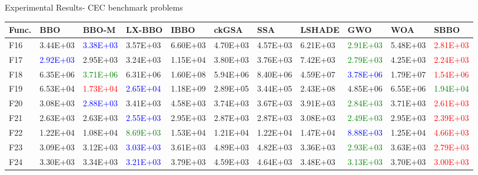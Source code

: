 \documentclass [9pt,times] {beamer}
\begin{document}
 \begin{frame}{Experimental Results- CEC benchmark problems }
     
  \begin{center}
       \fontsize{4.3pt}{7.3pt}\selectfont
\begin{tabular}{p{0.08in}  p{0.25in} |  p{0.23in} |  p{0.25in}|  p{0.25in} |  p{0.25in} | p{0.25in} |  p{0.25in} | p{0.25in} |  p{0.25in} |  p{0.25in}}
    \hline
\textbf{Func.} 		&	 \textbf{BBO} 	&	 \textbf{BBO-M} &	 \textbf{LX-BBO} 	&	 \textbf{IBBO} 	&	 \textbf{ckGSA} 	&	 \textbf{SSA} 	&	\textbf{LSHADE} 	&	 \textbf{GWO} 	&	 \textbf{WOA} 	&	\textbf{SBBO} \\
\hline
F16	&	3.44E+03	&\textcolor{blue}{	3.38E+03	}&	3.57E+03	&	6.60E+03	&	4.70E+03	&	4.57E+03	&	6.21E+03	&\textcolor{green}{	2.91E+03	}&	5.48E+03	&\textcolor{red}{	2.81E+03	}\\
F17	&\textcolor{blue}{	2.92E+03	}&	2.95E+03	&	3.24E+03	&	1.15E+04	&	3.80E+03	&	3.76E+03	&	7.42E+03	&\textcolor{green}{	2.79E+03	}&	4.25E+03	&\textcolor{red}{	2.24E+03	}\\
F18	&	6.35E+06	&\textcolor{green}{	3.71E+06	}&	6.31E+06	&	1.60E+08	&	5.94E+06	&	8.40E+06	&	4.59E+07	&\textcolor{blue}{	3.78E+06	}&	1.79E+07	&\textcolor{red}{	1.54E+06	}\\
F19	&	6.53E+04	&\textcolor{red}{	1.73E+04	}&\textcolor{blue}{	2.65E+04	}&	1.18E+09	&	2.89E+05	&	3.44E+05	&	2.43E+08	&	4.85E+06	&	6.55E+06	&\textcolor{green}{	1.94E+04	}\\
F20	&	3.08E+03	&\textcolor{blue}{	2.88E+03	}&	3.41E+03	&	4.58E+03	&	3.74E+03	&	3.67E+03	&	3.91E+03	&\textcolor{green}{	2.84E+03	}&	3.71E+03	&\textcolor{red}{	2.61E+03	}\\
F21	&	2.63E+03	&	2.63E+03	&\textcolor{blue}{	2.55E+03	}&	2.95E+03	&	2.87E+03	&	2.87E+03	&	3.08E+03	&\textcolor{green}{	2.49E+03	}&	2.95E+03	&\textcolor{red}{	2.39E+03	}\\
F22	&	1.22E+04	&	1.08E+04	&\textcolor{green}{	8.69E+03	}&	1.53E+04	&	1.21E+04	&	1.22E+04	&	1.47E+04	&\textcolor{blue}{	8.88E+03	}&	1.25E+04	&\textcolor{red}{	4.66E+03	}\\
F23	&	3.09E+03	&	3.12E+03	&\textcolor{blue}{	3.03E+03	}&	3.61E+03	&	4.89E+03	&	4.82E+03	&	3.36E+03	&\textcolor{green}{	2.93E+03	}&	3.63E+03	&\textcolor{red}{	2.79E+03	}\\
F24	&	3.30E+03	&	3.34E+03	&\textcolor{blue}{	3.21E+03	}&	3.79E+03	&	4.59E+03	&	4.64E+03	&	3.48E+03	&\textcolor{green}{	3.13E+03	}&	3.70E+03	&\textcolor{red}{	3.00E+03	}\\

\end{tabular}
\end{center}
\end{frame}
\end{document}
